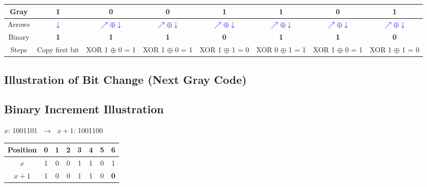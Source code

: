  \begin{center}
\renewcommand{\arraystretch}{1.3}
\begin{tabular}{|c|*7{c|}}
  \hline
    Gray &
    1 &    0 &    0 &    1 &    1 &    0 &    1  \\
  \hline

  Arrows &
      \textcolor{blue}{$\downarrow$} &
        \textcolor{blue}{$\nearrow \oplus \downarrow$} &        \textcolor{blue}{$\nearrow \oplus \downarrow$} &        \textcolor{blue}{$\nearrow \oplus \downarrow$} &        \textcolor{blue}{$\nearrow \oplus \downarrow$} &        \textcolor{blue}{$\nearrow \oplus \downarrow$} &        \textcolor{blue}{$\nearrow \oplus \downarrow$}  \\
  \hline

    Binary &
    \textbf{ 1 } &    \textbf{ 1 } &    \textbf{ 1 } &    \textbf{ 0 } &    \textbf{ 1 } &    \textbf{ 1 } &    \textbf{ 0 }  \\
  \hline

  Steps &
    {\scriptsize Copy first bit } &    {\scriptsize XOR 1 $\oplus$ 0 = 1 } &    {\scriptsize XOR 1 $\oplus$ 0 = 1 } &    {\scriptsize XOR 1 $\oplus$ 1 = 0 } &    {\scriptsize XOR 0 $\oplus$ 1 = 1 } &    {\scriptsize XOR 1 $\oplus$ 0 = 1 } &    {\scriptsize XOR 1 $\oplus$ 1 = 0 }  \\
  \hline
\end{tabular}
\end{center}


\bigskip

\subsection*{Illustration of Bit Change (Next Gray Code)}
\subsection*{Binary Increment Illustration}

$x$: 1001101 $\;\to\;$ $x+1$: 1001100

\begin{tabular}{|c|*7{c|}}
\hline
Position &  0 &  1 &  2 &  3 &  4 &  5 &  6   \\
\hline
$x$ &  1 &  0 &  0 &  1 &  1 &  0 &  1   \\
\hline
$x+1$ &     1
&    0
&    0
&    1
&    1
&    0
&    \cellcolor{yellow}\textbf{ 0 }
 \\
\hline
\end{tabular}


